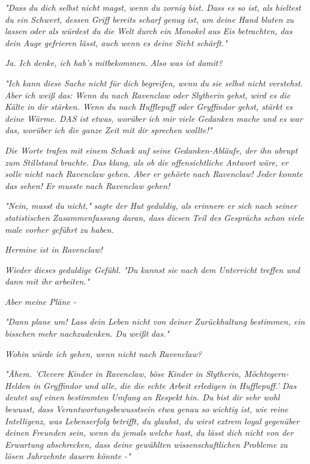 {\emph{\emph{"Dass du dich selbst nicht magst, wenn du zornig bist. Dass es so ist, als hieltest du ein Schwert, dessen Griff bereits scharf genug ist, um deine Hand bluten zu lassen oder als würdest du die Welt durch ein Monokel aus Eis betrachten, das dein Auge gefrieren lässt, auch wenn es deine Sicht schärft."}}

\emph{Ja. Ich denke, ich hab's mitbekommen. Also was ist damit?}

\emph{"Ich kann diese Sache nicht für dich begreifen, wenn du sie selbst nicht verstehst. Aber ich weiß das: Wenn du nach Ravenclaw oder Slytherin} \emph{gehst, wird es die Kälte in dir stärken. Wenn du nach Hufflepuff oder Gryffindor gehst, stärkt es deine Wärme. DAS ist etwas, worüber ich mir viele Gedanken mache und es war das, worüber ich die ganze Zeit mit dir sprechen wollte!"}

\emph{Die Worte trafen mit einem Schock auf seine Gedanken-Abläufe, der ihn abrupt zum Stillstand brachte. Das klang, als ob die offensichtliche Antwort wäre, er solle nicht nach Ravenclaw gehen. Aber er} \emph{\emph{gehörte}} \emph{nach Ravenclaw!} \emph{\emph{Jeder}} \emph{konnte das sehen! Er} \emph{\emph{musste}} \emph{nach Ravenclaw gehen!}

\emph{\emph{"Nein, musst du nicht,"}} \emph{sagte der Hut geduldig, als erinnere er sich nach seiner statistischen Zusammenfassung daran, dass} \emph{\emph{diesen}} \emph{Teil des Gesprächs schon viele male vorher geführt zu haben.}

\emph{\emph{Hermine ist in Ravenclaw!}}

\emph{Wieder dieses geduldige Gefühl.} \emph{\emph{"Du kannst sie nach dem Unterricht treffen und dann mit ihr arbeiten."}}

\emph{Aber meine Pläne -}

\emph{"Dann plane um! Lass dein Leben nicht von deiner Zurückhaltung bestimmen, ein bisschen mehr nachzudenken. Du} \emph{weißt} \emph{\emph{das."}}

\emph{Wohin würde ich gehen, wenn nicht nach Ravenclaw?}

\emph{"Ähem. '\emph{Clevere Kinder in Ravenclaw, böse Kinder in Slytherin, Möchtegern-Helden in Gryffindor und alle, die die echte Arbeit erledigen in Hufflepuff.' Das deutet auf einen bestimmten Umfang an Respekt hin. Du bist dir sehr wohl bewusst, dass Verantwortungsbewusstsein etwa genau so wichtig ist, wie reine Intelligenz, was Lebenserfolg betrifft, du glaubst, du wirst extrem loyal gegenüber deinen Freunden sein, wenn du jemals welche hast, du lässt dich nicht von der Erwartung abschrecken, dass deine gewählten wissenschaftlichen Probleme zu lösen Jahrzehnte dauern könnte -"}}

}
